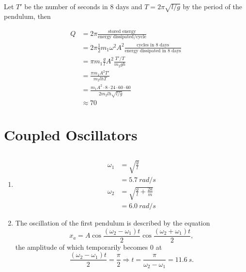 \documentclass{article}
\begin{document}
\subsection{}

Let $T'$ be the number of seconds in 8 days and $T = 2 \pi \sqrt{l / g}$ by the period of the pendulum, then

\begin{align*}
  Q & = 2 \pi \frac{\text{stored energy}}{\text{energy dissipated/cycle}}                                     \\
    & = 2 \pi \frac{1}{2} m_1 \omega^2 A^2 \frac{\text{cycles in 8 days}}{\text{energy dissipated in 8 days}} \\
    & = \pi m_1 \frac{g}{l} A^2 \frac{T' / T}{m_2 g h}                                                        \\
    & = \frac{\pi m_1 A^2 T'}{m_2 l h T}                                                                      \\
    & = \frac{m_1 A^2 \cdot 8 \cdot 24 \cdot 60 \cdot 60}{2 m_2 l h \sqrt{l / g}}                             \\
    & \approx 70
\end{align*}

\section{Coupled Oscillators}

\subsection{}

\begin{enumerate}
  \item

        \begin{align*}
          \omega_1 & = \sqrt{\frac{g}{l}}                 \\
                   & = \qty{5.7}{rad/s}                   \\
          \omega_2 & = \sqrt{\frac{g}{l} + \frac{2 k}{m}} \\
                   & = \qty{6.0}{rad/s}
        \end{align*}

  \item The oscillation of the first pendulum is described by the equation \[x_a = A \cos \frac{(\omega_2 - \omega_1) t}{2} \cos \frac{(\omega_2 + \omega_1) t}{2},\] the amplitude of which temporarily becomes $0$ at \[\frac{(\omega_2 - \omega_1) t}{2} = \frac{\pi}{2} \Rightarrow t = \frac{\pi}{\omega_2 - \omega_1} = \qty{11.6}{s}.\]
\end{enumerate}
\end{document}
